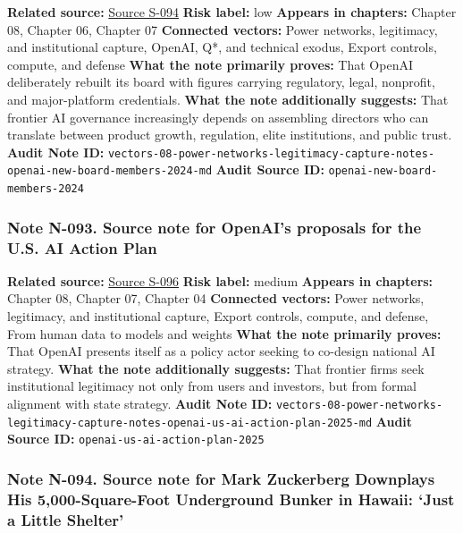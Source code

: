 \documentclass[
  american,
  11pt,
  letterpaper,
]{article}
\begin{document}
\textbf{Related source:}
\hyperref[source-s-094-openai-announces-new-members-to-board-of-directors]{Source
S-094} \textbf{Risk label:} low \textbf{Appears in chapters:} Chapter
08, Chapter 06, Chapter 07 \textbf{Connected vectors:} Power networks,
legitimacy, and institutional capture, OpenAI, Q*, and technical exodus,
Export controls, compute, and defense \textbf{What the note primarily
proves:} That OpenAI deliberately rebuilt its board with figures
carrying regulatory, legal, nonprofit, and major-platform credentials.
\textbf{What the note additionally suggests:} That frontier AI
governance increasingly depends on assembling directors who can
translate between product growth, regulation, elite institutions, and
public trust. \textbf{Audit Note ID:}
\texttt{vectors-08-power-networks-legitimacy-capture-notes-openai-new-board-members-2024-md}
\textbf{Audit Source ID:} \texttt{openai-new-board-members-2024}

\subsubsection{Note N-093. Source note for OpenAI's proposals for the
U.S. AI Action
Plan}\label{note-n-093-vectors-08-power-networks-legitimacy-capture-notes-openai-us-ai-action-plan-2025-md}

\textbf{Related source:}
\hyperref[source-s-096-openais-proposals-for-the-us-ai-action-plan]{Source
S-096} \textbf{Risk label:} medium \textbf{Appears in chapters:} Chapter
08, Chapter 07, Chapter 04 \textbf{Connected vectors:} Power networks,
legitimacy, and institutional capture, Export controls, compute, and
defense, From human data to models and weights \textbf{What the note
primarily proves:} That OpenAI presents itself as a policy actor seeking
to co-design national AI strategy. \textbf{What the note additionally
suggests:} That frontier firms seek institutional legitimacy not only
from users and investors, but from formal alignment with state strategy.
\textbf{Audit Note ID:}
\texttt{vectors-08-power-networks-legitimacy-capture-notes-openai-us-ai-action-plan-2025-md}
\textbf{Audit Source ID:} \texttt{openai-us-ai-action-plan-2025}

\subsubsection{Note N-094. Source note for Mark Zuckerberg Downplays His
5,000-Square-Foot Underground Bunker in Hawaii: `Just a Little
Shelter'}\label{note-n-094-vectors-08-power-networks-legitimacy-capture-notes-people-zuckerberg-little-shelter-2024-md}
\end{document}
